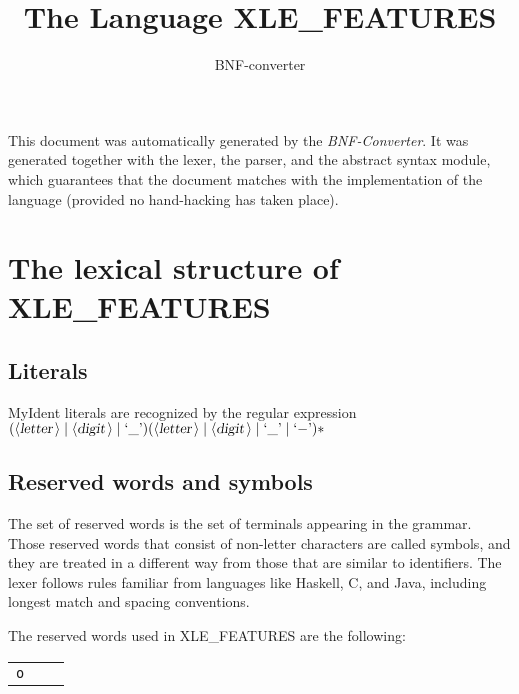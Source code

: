 \documentclass[a4paper,11pt]{article}
\author{BNF-converter}
\title{The Language XLE_FEATURES}
\begin{document}
\maketitle

\newcommand{\emptyP}{\mbox{$\epsilon$}}
\newcommand{\terminal}[1]{\mbox{{\texttt {#1}}}}
\newcommand{\nonterminal}[1]{\mbox{$\langle \mbox{{\sl #1 }} \! \rangle$}}
\newcommand{\arrow}{\mbox{::=}}
\newcommand{\delimit}{\mbox{$|$}}
\newcommand{\reserved}[1]{\mbox{{\texttt {#1}}}}
\newcommand{\literal}[1]{\mbox{{\texttt {#1}}}}
\newcommand{\symb}[1]{\mbox{{\texttt {#1}}}}

This document was automatically generated by the {\em BNF-Converter}. It was generated together with the lexer, the parser, and the abstract syntax module, which guarantees that the document matches with the implementation of the language (provided no hand-hacking has taken place).

\section*{The lexical structure of XLE_FEATURES}

\subsection*{Literals}


MyIdent literals are recognized by the regular expression
\(({\nonterminal{letter}} \mid {\nonterminal{digit}} \mid \mbox{`\_'}) ({\nonterminal{letter}} \mid {\nonterminal{digit}} \mid \mbox{`\_'} \mid \mbox{`{$-$}'})*\)


\subsection*{Reserved words and symbols}
The set of reserved words is the set of terminals appearing in the grammar. Those reserved words that consist of non-letter characters are called symbols, and they are treated in a different way from those that are similar to identifiers. The lexer follows rules familiar from languages like Haskell, C, and Java, including longest match and spacing conventions.

The reserved words used in XLE_FEATURES are the following: \\

\begin{tabular}{lll}
{\reserved{o}} & & \\
\end{tabular}\\
\end{document}
